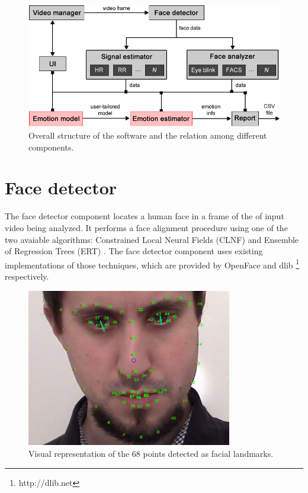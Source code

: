 \begin{figure}[h]
    \centering
    \includegraphics[width=\textwidth]{figures/tool-overall-structure.png}
    \caption{Overall structure of the software and the relation among different components.}
    \label{fig:tool-overall-structure}
\end{figure}

\section{Face detector}

The face detector component locates a human face in a frame of the of input video being analyzed. It performs a face alignment procedure using one of the two avaiable algorithms: Constrained Local Neural Fields (CLNF) \parencite{baltrusaitis2013constrained} and Ensemble of Regression Trees (ERT) \parencite{kazemi2014one}. The face detector component uses existing implementations of those techniques, which are provided by OpenFace \parencite{baltruvsaitis2016openface} and dlib \footnote{http://dlib.​net} \parencite{dlib09} respectively.

\begin{figure}
    \centering
    \includegraphics[width=0.8\textwidth]{figures/tool-ui-face-detector.png}
    \caption{Visual representation of the 68 points detected as facial landmarks.}
    \label{fig:tool-ui-face-detector}
\end{figure}

